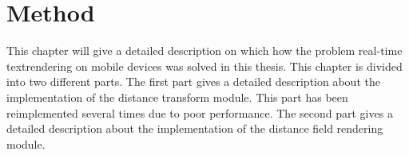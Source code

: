 \chapter{Method}\label{cha:method}
This chapter will give a detailed description on which how the problem real-time textrendering on mobile devices was solved in this thesis. This chapter is divided into two different parts. The first part gives a detailed description about the implementation of the distance transform module. This part has been reimplemented several times due to poor performance. The second part gives a detailed description about the implementation of the distance field rendering module.